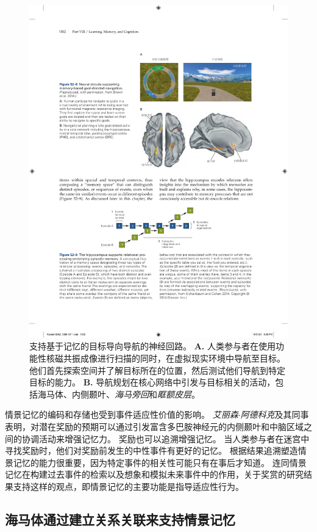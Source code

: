 \begin{figure}[htbp]
	\centering
	\includegraphics[width=0.75\linewidth]{chap52/fig_52_8}
	\caption{支持基于记忆的目标导向导航的神经回路\cite{brown2016prospective}。
		\textbf{A.} 人类参与者在使用功能性核磁共振成像进行扫描的同时，在虚拟现实环境中导航至目标。
		他们首先探索空间并了解目标所在的位置，然后测试他们导航到特定目标的能力。
		\textbf{B.} 导航规划在核心网络中引发与目标相关的活动，包括海马体、内侧颞叶、\textit{海马旁回}和\textit{眶额皮层}。}
	\label{fig:52_8}
\end{figure}


情景记忆的编码和存储也受到事件适应性价值的影响。
\textit{艾丽森$\cdot$阿德科克}及其同事表明，对潜在奖励的预期可以通过引发富含多巴胺神经元的内侧颞叶和中脑区域之间的协调活动来增强记忆力。
奖励也可以追溯增强记忆。
当人类参与者在迷宫中寻找奖励时，他们对奖励前发生的中性事件有更好的记忆。
根据结果追溯塑造情景记忆的能力很重要，因为特定事件的相关性可能只有在事后才知道。
连同情景记忆在构建过去事件的检索以及想象和模拟未来事件中的作用，关于奖赏的研究结果支持这样的观点，即情景记忆的主要功能是指导适应性行为。



\subsection{海马体通过建立关系关联来支持情景记忆}

